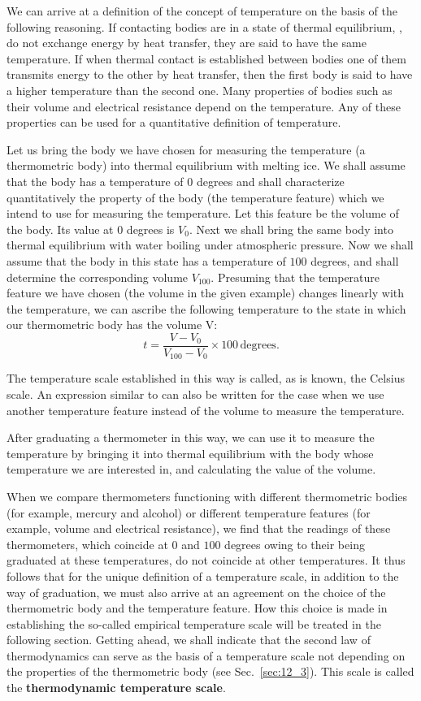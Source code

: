 We can arrive at a definition of the concept of temperature on the basis of the following reasoning. If contacting bodies are in a state of thermal equilibrium, \ie, do not exchange energy by heat transfer, they are said to have the same temperature. If when thermal contact is established between bodies one of them transmits energy to the other by heat transfer, then the first body is said to have a higher temperature than the second one. Many properties of bodies such as their volume and electrical resistance depend on the temperature. Any of these properties can be used for a quantitative definition of temperature.

Let us bring the body we have chosen for measuring the temperature (a thermometric body) into thermal equilibrium with melting ice. We shall assume that the body has a temperature of $0$ degrees and shall characterize quantitatively the property of the body (the temperature feature) which we intend to use for measuring the temperature. Let this feature be the volume of the body. Its value at $0$ degrees is $V_0$. Next we shall bring the same body into thermal equilibrium with water boiling under atmospheric pressure. Now we shall assume that the body in this state has a temperature of $100$ degrees, and shall determine the corresponding volume $V_{100}$. Presuming that the temperature feature we have chosen (the volume in the given example) changes linearly with the temperature, we can ascribe the following temperature to the state in which our thermometric body has the volume V:
\begin{equation}\label{eq:10_14}
	t = \frac{V - V_0}{V_{100} - V_0}\times 100\,\text{degrees}.
\end{equation}

\noindent
The temperature scale established in this way is called, as is known, the Celsius scale. An expression similar to  can also be written for the case when we use another temperature feature instead of the volume to measure the temperature.

After graduating a thermometer in this way, we can use it to measure the temperature by bringing it into thermal equilibrium with the body whose temperature we are interested in, and calculating the value of the volume.

When we compare thermometers functioning with different thermometric bodies (for example, mercury and alcohol) or different temperature features (for example, volume and electrical resistance), we find that the readings of these thermometers, which coincide at $0$ and $100$ degrees owing to their being graduated at these temperatures, do not coincide at other temperatures. It thus follows that for the unique definition of a temperature scale, in addition to the way of graduation, we must also arrive at an agreement on the choice of the thermometric body and the temperature feature. How this choice is made in establishing the so-called empirical temperature scale will be treated in the following section. Getting ahead, we shall indicate that the second law of thermodynamics can serve as the basis of a temperature scale not depending on the properties of the thermometric body (see Sec.~\ref{sec:12_3}). This scale is called the \textbf{thermodynamic temperature scale}.

